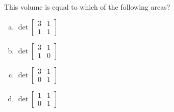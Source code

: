 \begin{applicationActivities}
\begin{activity}{5}
\begin{center}
  \end{center}
This volume is equal to which of the following areas?
\begin{multicols}{4}
\begin{enumerate}[(a)]
\item $\det \begin{bmatrix} 3 & 1 \\ 1 & 1 \end{bmatrix}$
\item $\det \begin{bmatrix} 3 & 1 \\ 1 & 0 \end{bmatrix}$
\item $\det \begin{bmatrix} 3 & 1 \\ 0 & 1 \end{bmatrix}$
\item $\det \begin{bmatrix} 1 & 1 \\ 0 & 1 \end{bmatrix}$
\end{enumerate}
\end{multicols}
\end{activity}


\end{applicationActivities}
